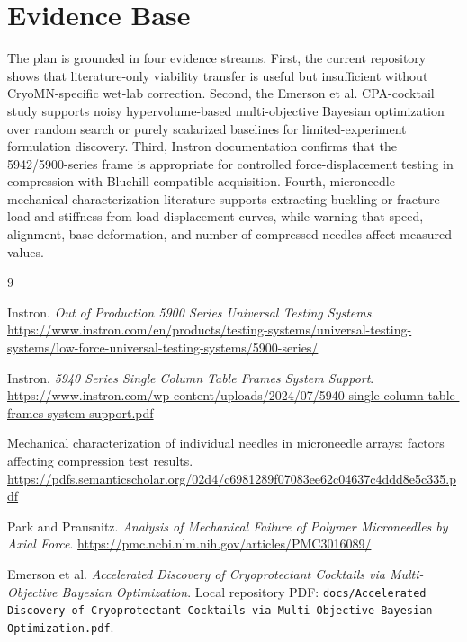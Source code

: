 \documentclass[11pt]{article}
\newcommand{\code}[1]{\texttt{#1}}
\begin{document}
\section{Evidence Base}

The plan is grounded in four evidence streams. First, the current repository shows that
literature-only viability transfer is useful but insufficient without CryoMN-specific
wet-lab correction. Second, the Emerson et al. CPA-cocktail study supports noisy
hypervolume-based multi-objective Bayesian optimization over random search or purely
scalarized baselines for limited-experiment formulation discovery. Third, Instron
documentation confirms that the 5942/5900-series frame is appropriate for controlled
force-displacement testing in compression with Bluehill-compatible acquisition. Fourth,
microneedle mechanical-characterization literature supports extracting buckling or
fracture load and stiffness from load-displacement curves, while warning that speed,
alignment, base deformation, and number of compressed needles affect measured values.

\begin{thebibliography}{9}

Instron.
\textit{Out of Production 5900 Series Universal Testing Systems}.
\url{https://www.instron.com/en/products/testing-systems/universal-testing-systems/low-force-universal-testing-systems/5900-series/}

Instron.
\textit{5940 Series Single Column Table Frames System Support}.
\url{https://www.instron.com/wp-content/uploads/2024/07/5940-single-column-table-frames-system-support.pdf}

Mechanical characterization of individual needles in microneedle arrays: factors
affecting compression test results.
\url{https://pdfs.semanticscholar.org/02d4/c6981289f07083ee62c04637c4ddd8e5c335.pdf}

Park and Prausnitz.
\textit{Analysis of Mechanical Failure of Polymer Microneedles by Axial Force}.
\url{https://pmc.ncbi.nlm.nih.gov/articles/PMC3016089/}

Emerson et al.
\textit{Accelerated Discovery of Cryoprotectant Cocktails via Multi-Objective Bayesian Optimization}.
Local repository PDF:
\code{docs/Accelerated Discovery of Cryoprotectant Cocktails via Multi-Objective Bayesian Optimization.pdf}.

\end{thebibliography}
\end{document}

